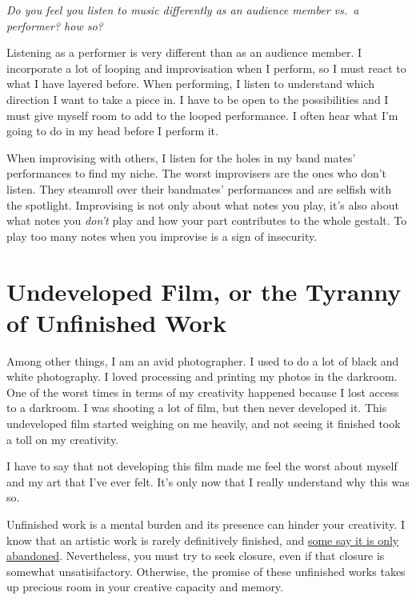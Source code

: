 \documentclass[
]{book}
\begin{document}
\emph{Do you feel you listen to music differently as an audience member vs.~a performer? how so?}

Listening as a performer is very different than as an audience member. I incorporate a lot of looping and improvisation when I perform, so I must react to what I have layered before. When performing, I listen to understand which direction I want to take a piece in. I have to be open to the possibilities and I must give myself room to add to the looped performance. I often hear what I'm going to do in my head before I perform it.

When improvising with others, I listen for the holes in my band mates' performances to find my niche. The worst improvisers are the ones who don't listen. They steamroll over their bandmates' performances and are selfish with the spotlight. Improvising is not only about what notes you play, it's also about what notes you \emph{don't} play and how your part contributes to the whole gestalt. To play too many notes when you improvise is a sign of insecurity.

\hypertarget{undeveloped-film-or-the-tyranny-of-unfinished-work}{%
\chapter{Undeveloped Film, or the Tyranny of Unfinished Work}\label{undeveloped-film-or-the-tyranny-of-unfinished-work}}

Among other things, I am an avid photographer. I used to do a lot of black and white photography. I loved processing and printing my photos in the darkroom. One of the worst times in terms of my creativity happened because I lost access to a darkroom. I was shooting a lot of film, but then never developed it. This undeveloped film started weighing on me heavily, and not seeing it finished took a toll on my creativity.

I have to say that not developing this film made me feel the worst about myself and my art that I've ever felt. It's only now that I really understand why this was so.

Unfinished work is a mental burden and its presence can hinder your creativity. I know that an artistic work is rarely definitively finished, and \href{https://quoteinvestigator.com/2019/03/01/abandon/}{some say it is only abandoned}. Nevertheless, you must try to seek closure, even if that closure is somewhat unsatisifactory. Otherwise, the promise of these unfinished works takes up precious room in your creative capacity and memory.
\end{document}
